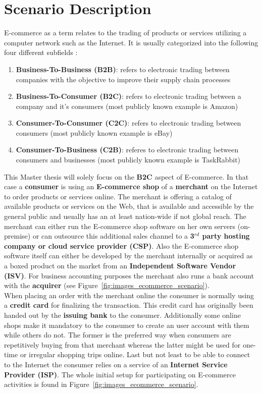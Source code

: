 
\section{Scenario Description}
\label{sec:scenario_description}

E-commerce as a term relates to the trading of products or services utilizing a computer network such as the Internet. It is usually categorized into the following four different subfields \citep{sen2015study}:\@

\begin{enumerate}
  \item \textbf{Business-To-Business (B2B)}: refers to electronic trading between companies with the objective to improve their supply chain processes
  \item \textbf{Business-To-Consumer (B2C)}: refers to electronic trading between a company and it's consumers (most publicly known example is Amazon)
  \item \textbf{Consumer-To-Consumer (C2C)}: refers to electronic trading between consumers (most publicly known example is eBay)
  \item \textbf{Consumer-To-Business (C2B)}: referes to electronic trading between consumers and businesses (most publicly known example is TaskRabbit)
\end{enumerate}

This Master thesis will solely focus on the \textbf{B2C} aspect of E-commerce. In that case a \textbf{consumer} is using an \textbf{E-commerce shop} of a \textbf{merchant} on the Internet to order products or services online. The merchant is offering a catalog of available products or services on the Web, that is available and accessible by the general public and usually has an at least nation-wide if not global reach. The merchant can either run the E-commerce shop software on her own servers (on-premise) or can outsource this additional sales channel to a \textbf{3$^{rd}$ party hosting company or cloud service provider (CSP)}. Also the E-commerce shop software itself can either be developed by the merchant internally or acquired as a boxed product on the market from an \textbf{Independent Software Vendor (ISV)}. For business accounting purposes the merchant also runs a bank account with the \textbf{acquirer} (see Figure~\ref{fig:images_ecommerce_scenario}). \\
When placing an order with the merchant online the consumer is normally using a \textbf{credit card} for finalizing the transaction. This credit card has originally been handed out by the \textbf{issuing bank} to the consumer. Additionally some online shops make it mandatory to the consumer to create an user account with them while others do not. The former is the preferred way when consumers are repetitively buying from that merchant whereas the latter might be used for one-time or irregular shopping trips online. Last but not least to be able to connect to the Internet the consumer relies on a service of an \textbf{Internet Service Provider (ISP)}. The whole initial setup for participating on E-commerce activities is found in Figure~\ref{fig:images_ecommerce_scenario}.\@

